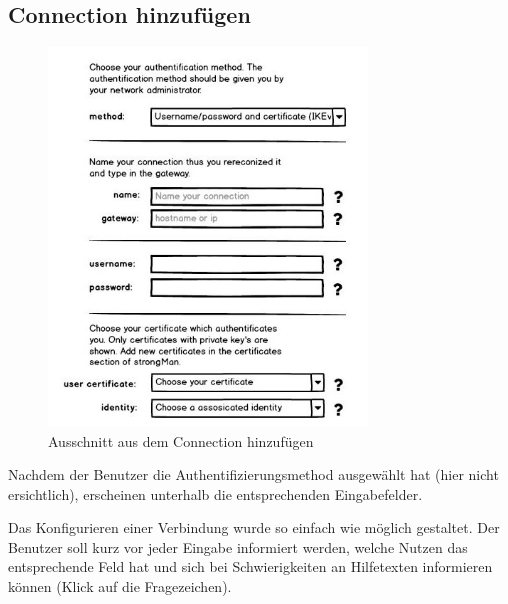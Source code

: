 \subsection{Connection hinzufügen}
\noindent\begin{minipage}[t]{0.55\textwidth}
\vspace{0pt}
    \begin{figure}[H]
    	\centering
    	\includegraphics[width=240pt]{images/mockups/short_con_config.jpg}
    	\caption{Ausschnitt aus dem Connection hinzufügen}
    \end{figure}
\end{minipage}
\hfill
\begin{minipage}[t]{0.45\textwidth}
\vspace{0pt}
Nachdem der Benutzer die Authentifizierungsmethod ausgewählt hat (hier nicht ersichtlich), erscheinen unterhalb die entsprechenden Eingabefelder.

Das Konfigurieren einer Verbindung wurde so einfach wie möglich gestaltet. Der Benutzer soll kurz vor jeder Eingabe informiert werden, welche Nutzen das entsprechende Feld hat und sich bei Schwierigkeiten an Hilfetexten informieren können (Klick auf die Fragezeichen).
\end{minipage}